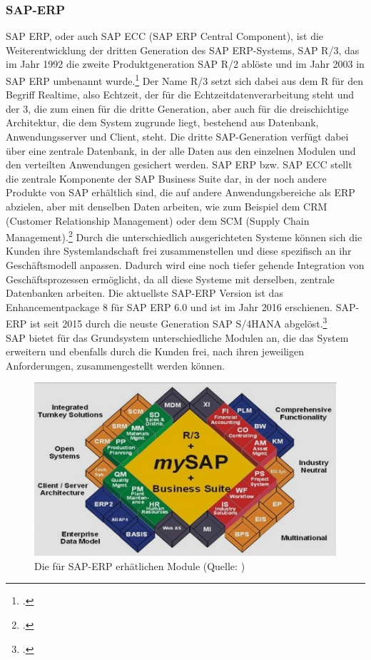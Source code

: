 \subsubsection{SAP-ERP}
\label{kap:R3}
SAP ERP, oder auch SAP ECC (SAP ERP Central Component), ist die Weiterentwicklung der dritten Generation des SAP ERP-Systems, \glqq{}SAP R/3\grqq{}, das im Jahr 1992 die zweite Produktgeneration \glqq{}SAP R/2\grqq{} ablöste und im Jahr 2003 in \glqq{}SAP ERP\grqq{} umbenannt wurde.\footcite[Vgl.][]{sap-unterschiede} Der Name \glqq{}R/3\grqq{} setzt sich dabei aus dem \glqq{}R\grqq{} für den Begriff \glqq{}Realtime\grqq{}, also Echtzeit, der für die Echtzeitdatenverarbeitung steht und der \glqq{}3\grqq{}, die zum einen für die dritte Generation, aber auch für die dreischichtige Architektur, die dem System zugrunde liegt, bestehend aus Datenbank, Anwendungsserver und Client, steht. Die dritte SAP-Generation verfügt dabei über eine zentrale Datenbank, in der alle Daten aus den einzelnen Modulen und den verteilten Anwendungen gesichert werden. SAP ERP bzw. SAP ECC stellt die zentrale Komponente der \glqq{}SAP Business Suite\grqq{} dar, in der noch andere Produkte von SAP erhältlich sind, die auf andere Anwendungsbereiche als ERP abzielen, aber mit denselben Daten arbeiten, wie zum Beispiel dem CRM (Customer Relationship Management) oder dem SCM (Supply Chain Management).\footcite[Vgl.][]{mindsquare-sap} Durch die unterschiedlich ausgerichteten Systeme können sich die Kunden ihre Systemlandschaft frei zusammenstellen und diese spezifisch an ihr Geschäftsmodell anpassen. Dadurch wird eine noch tiefer gehende Integration von Geschäftsprozessen ermöglicht, da all diese Systeme mit derselben, zentrale Datenbanken arbeiten. Die aktuellste SAP-ERP Version ist das Enhancementpackage 8 für SAP ERP 6.0 und ist im Jahr 2016 erschienen. \glqq{}SAP-ERP\grqq{} ist seit 2015 durch die neuste Generation \glqq{}SAP S/4HANA\grqq{} abgelöst.\footcite[Vgl.][]{sap-version}\\ SAP bietet für das Grundsystem unterschiedliche Modulen an, die das System erweitern und ebenfalls durch die Kunden frei, nach ihren jeweiligen Anforderungen, zusammengestellt werden können.

\begin{figure}[h!]
    \centering
    \includegraphics[scale=1]{Bilder/sap-module.jpg}
    \caption[Die Module von SAP-ERP]{Die für SAP-ERP erhätlichen Module (Quelle: \cite[][]{sap-module})}
    \label{fig:sapmodule}
\end{figure}

